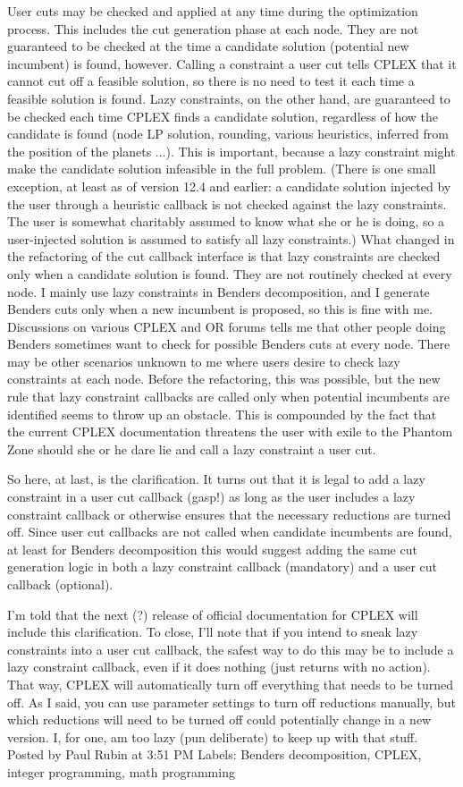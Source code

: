 {User cuts may be checked and applied at any time during the optimization process. This includes the cut generation phase at each node. They are not guaranteed to be checked at the time a candidate solution (potential new incumbent) is found, however. Calling a constraint a user cut tells CPLEX that it cannot cut off a feasible solution, so there is no need to test it each time a feasible solution is found.
Lazy constraints, on the other hand, are guaranteed to be checked each time CPLEX finds a candidate solution, regardless of how the candidate is found (node LP solution, rounding, various heuristics, inferred from the position of the planets ...). This is important, because a lazy constraint might make the candidate solution infeasible in the full problem. (There is one small exception, at least as of version 12.4 and earlier: a candidate solution injected by the user through a heuristic callback is not checked against the lazy constraints. The user is somewhat charitably assumed to know what she or he is doing, so a user-injected solution is assumed to satisfy all lazy constraints.) What changed in the refactoring of the cut callback interface is that lazy constraints are checked only when a candidate solution is found. They are not routinely checked at every node.
I mainly use lazy constraints in Benders decomposition, and I generate Benders cuts only when a new incumbent is proposed, so this is fine with me. Discussions on various CPLEX and OR forums tells me that other people doing Benders sometimes want to check for possible Benders cuts at every node. There may be other scenarios unknown to me where users desire to check lazy constraints at each node. Before the refactoring, this was possible, but the new rule that lazy constraint callbacks are called only when potential incumbents are identified seems to throw up an obstacle. This is compounded by the fact that the current CPLEX documentation threatens the user with exile to the Phantom Zone should she or he dare lie and call a lazy constraint a user cut.

So here, at last, is the clarification. It turns out that it is legal to add a lazy constraint in a user cut callback (gasp!) as long as the user includes a lazy constraint callback or otherwise ensures that the necessary reductions are turned off. Since user cut callbacks are not called when candidate incumbents are found, at least for Benders decomposition this would suggest adding the same cut generation logic in both a lazy constraint callback (mandatory) and a user cut callback (optional).

I'm told that the next (?) release of official documentation for CPLEX will include this clarification. To close, I'll note that if you intend to sneak lazy constraints into a user cut callback, the safest way to do this may be to include a lazy constraint callback, even if it does nothing (just returns with no action). That way, CPLEX will automatically turn off everything that needs to be turned off. As I said, you can use parameter settings to turn off reductions manually, but which reductions will need to be turned off could potentially change in a new version. I, for one, am too lazy (pun deliberate) to keep up with that stuff.
Posted by Paul Rubin at 3:51 PM  
Labels: Benders decomposition, CPLEX, integer programming, math programming
}